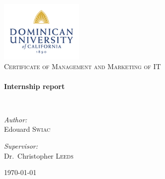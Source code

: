 \begin{titlepage}

\begin{center}


\includegraphics[width=0.30\textwidth]{./dominican}
\\[1cm]

\textsc{Certificate of Management and Marketing of IT}
\\[1.5cm]


\HRule
\\[0.4cm]
{ \huge \bfseries Internship report}


\HRule 
\\[1.5cm]

\begin{minipage}{0.4\textwidth}
\begin{flushleft} \large
\emph{Author:}\\
Edouard \textsc{Swiac}
\end{flushleft}
\end{minipage}
\begin{minipage}{0.4\textwidth}
\begin{flushright} \large
\emph{Supervisor:} \\
Dr.~Christopher \textsc{Leeds}
\end{flushright}
\end{minipage}

\vfill

{\large \today}

\end{center}

\end{titlepage}